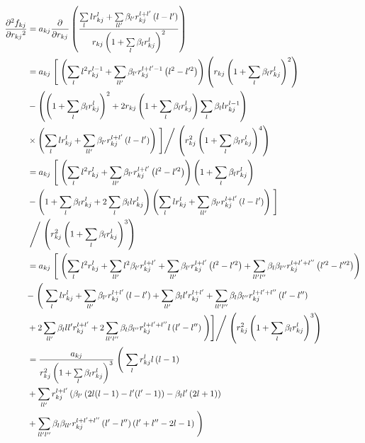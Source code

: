         \begin{align}
            \prd{r_{kj}}[f_{kj}][2] &= a_{kj}
            \prd{r_{kj}}\left(\frac{\sum\limits_l lr^l_{kj} +
            \sum\limits_{ll'}\beta_{l'}r^{l+l'}_{kj}\left(l-l'\right)}{r_{kj}
            \left(1 + \sum\limits_l\beta_lr^l_{kj}\right)^2}\right) \nonumber
            \\
            &= a_{kj} \Biggm[\left(\sumll{l}l^2r^{l-1}_{kj} +
            \sumll{ll'}\beta_{l'}r^{l+l'-1}_{kj}\left(l^2-l'^2\right)\right)
            \left(r_{kj} \left(1 + \sum\limits_l\beta_lr^l_{kj}\right)^2\right)
            \nonumber \\ &-\left(\left(1 +
            \sum\limits_l\beta_lr^l_{kj}\right)^2 + 2r_{kj}\left(1 +
            \sumll{l}\beta_lr^l_{kj}\right)\sumll{l}\beta_llr^{l-1}_{kj}\right)
            \nonumber \\ &\times\left(\sum\limits_l lr^l_{kj} +
            \sum\limits_{ll'}\beta_{l'}r^{l+l'}_{kj}\left(l-l'\right)\right)
            \Biggm] \Biggm/ \left(r^2_{kj} \left(1 +
            \sum\limits_l\beta_lr^l_{kj}\right)^4\right) \nonumber \\
            &= a_{kj} \Biggm[\left(\sumll{l}l^2r^l_{kj} +
            \sumll{ll'}\beta_{l'}r^{l+l'}_{kj}\left(l^2-l'^2\right)\right)
            \left(1 + \sumll{l}\beta_lr^l_{kj}\right) \nonumber \\ &-\left(1 +
            \sumll{l}\beta_lr^l_{kj} + 2
            \sumll{l}\beta_llr^l_{kj}\right) \left(\sum\limits_l lr^l_{kj}
            + \sumll{ll'}\beta_{l'}r^{l+l'}_{kj}\left(l-l'\right)\right)
            \Biggm] \nonumber \\ &\Biggm/ \left(r^2_{kj} \left(1 +
            \sum\limits_l\beta_lr^l_{kj}\right)^3\right) \nonumber \\
            &= a_{kj} \Biggm[\left(\sumll{l}l^2r^l_{kj} +
            \sumll{ll'}l^2\beta_{l'}r^{l+l'}_{kj} +
            \sumll{ll'}\beta_{l'}r^{l+l'}_{kj}\left(l^2-l'^2\right) +
            \sumll{ll'l''}\beta_l\beta_{l''}r^{l+l'+l''}_{kj}\left(l'^2-l''^2\right)\right)
            \nonumber \\ &- \Biggm(\sumll{l}lr^l_{kj} +
            \sumll{ll'}\beta_{l'}r^{l+l'}_{kj}\left(l-l'\right) +
            \sumll{ll'}\beta_ll'r^{l+l'}_{kj} +
            \sumll{ll'l''}\beta_l\beta_{l''}r^{l+l'+l''}_{kj}\left(l'-l''\right)
            \nonumber \\ &+ 2\sumll{ll'}\beta_lll'r^{l+l'}_{kj} +
            2\sumll{ll'l''}\beta_l\beta_{l''}r^{l+l'+l''}_{kj}l\left(l'-l''\right)\Biggm)\Biggm]
            \Biggm/ \left(r^2_{kj} \left(1 +
            \sum\limits_l\beta_lr^l_{kj}\right)^3\right) \nonumber \\
            &= \frac{a_{kj}}{r^2_{kj} \left(1 + \sum\limits_l\beta_lr^l_{kj}\right)^3} \Biggm( \sumll{l}r^l_{kj}l\left(l-1\right) \nonumber \\
            &+ \sumll{ll'}r^{l+l'}_{kj}\left(\beta_{l'}\left(2l(l-1) - l'(l'-1)\right) - \beta_ll'\left(2l+1\right)\right) \nonumber \\
            &+ \sumll{ll'l''}\beta_l\beta_{ll'}r^{l+l'+l''}_{kj}\left(l'-l''\right)\left(l'+l''-2l-1\right)\Biggm)
        \end{align}
